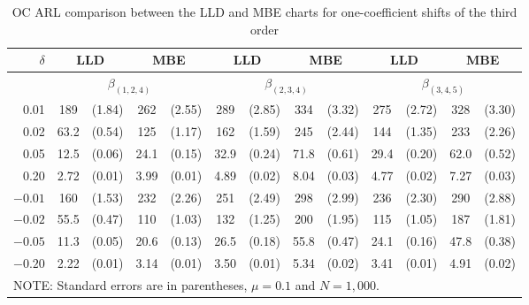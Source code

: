 \begin{table}[!ht]
\tabcolsep 4.5pt \vspace{-0.1cm} \centering \caption{OC ARL comparison between the
LLD and MBE charts for one-coefficient shifts of the third order} \vspace{0.3cm}
\renewcommand{\arraystretch}{1.25}
\begin{tabular}{r|cccc|cccc|cccc}\hline
$\delta$ & \multicolumn{2}{c}{LLD} & \multicolumn{2}{c|}{MBE} &
\multicolumn{2}{c}{LLD} & \multicolumn{2}{c|}{MBE} & \multicolumn{2}{c}{LLD} &
\multicolumn{2}{c}{MBE}
\\\hline
& \multicolumn{4}{c|}{$\beta_{(1,2,4)}$} & \multicolumn{4}{c|}{$\beta_{(2,3,4)}$} &
\multicolumn{4}{c}{$\beta_{(3,4,5)}$}
\\\hline
0.01 & 189 & (1.84) & 262 & (2.55) & 289 & (2.85) & 334 & (3.32) & 275 & (2.72) &
328 & (3.30)
\\
0.02 & 63.2 & (0.54) & 125 & (1.17) & 162 & (1.59) & 245 & (2.44) & 144 & (1.35) &
233 & (2.26)
\\
0.05 & 12.5 & (0.06) & 24.1 & (0.15) & 32.9 & (0.24) & 71.8 & (0.61) & 29.4 & (0.20)
& 62.0 & (0.52)
\\
0.20 & 2.72 & (0.01) & 3.99 & (0.01) & 4.89 & (0.02) & 8.04 & (0.03) & 4.77 & (0.02)
& 7.27 & (0.03)
\\
$-0.01$ & 160 & (1.53) & 232 & (2.26) & 251 & (2.49) & 298 & (2.99) & 236 & (2.30) &
290 & (2.88)
\\
$-0.02$ & 55.5 & (0.47) & 110 & (1.03) & 132 & (1.25) & 200 & (1.95) & 115 & (1.05)
& 187 & (1.81)
\\
$-0.05$ & 11.3 & (0.05) & 20.6 & (0.13) & 26.5 & (0.18) & 55.8 & (0.47) & 24.1 &
(0.16) & 47.8 & (0.38)
\\
$-0.20$ & 2.22 & (0.01) & 3.14 & (0.01) & 3.50 & (0.01) & 5.34 & (0.02) & 3.41 &
(0.01) & 4.91 & (0.02)
\\\hline
\multicolumn{13}{l}{NOTE: Standard errors are in parentheses, $\mu=0.1$ and
$N=1,000$.}
\end{tabular}
\end{table}

